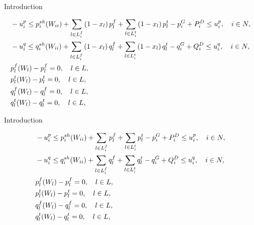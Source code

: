 \documentclass[xcolor=dvipsnames]{beamer}
\newcommand{\p}[1]{p^{#1}}
\newcommand{\q}[1]{q^{#1}}
\newcommand{\ii}{i}
\newcommand{\llll}{l}
\newcommand{\from}{f}
\newcommand{\tto}{t}
\newcommand{\WW}{W}
\newcommand{\Lines}{L}
\begin{document}
\begin{frame}{Introduction}
\begin{footnotesize}
\begin{subequations}
\label{EqPFEq}
\begin{align}
  & -u_i^p \leq  p_i^{sh}(\WW_{ii}) 
+ \sum_{\llll \in \Lines_\ii^{\from} } \left( 1 - x_\llll\right) \p{\from}_{\llll} 
	+\sum_{\llll \in \Lines_\ii^{\tto} } \left( 1 - x_\llll\right)\p{\tto}_{\llll} - p^G_i + P^D_i \le u_i^p, \quad i\in N, \notag\\ 
  &-u_i^q \leq q_\ii^{sh}(\WW_{\ii\ii}) + \sum_{\llll \in \Lines_\ii^{\from} } \left( 1 - x_\llll\right) \q{\from}_{\llll} +\sum_{\llll \in \Lines_\ii^{\tto} } \left( 1 - x_\llll\right) \q{\tto}_{\llll} - q^G_i + Q^D_i \le u_i^q, \quad i\in N, \notag \\
& \p{\from}_{\llll}(\WW_\llll) - \p{\from}_{\llll} = 0, \quad \llll \in L, \notag \\
& \p{\tto}_{\llll}(\WW_\llll) - \p{\tto}_{\llll} = 0, \quad \llll \in L, \notag \\
& \q{\from}_{\llll}(\WW_\llll) - \q{\from}_{\llll} = 0, \quad \llll \in L, \notag \\
& \q{\tto}_{\llll}(\WW_\llll) - \q{\tto}_{\llll} = 0, \quad \llll \in L, \notag 
\end{align}
\end{subequations}
\end{footnotesize}

\end{frame}

\begin{frame}{Introduction}
\begin{footnotesize}
\begin{subequations}
\label{EqPFEq}
\begin{align}
  & -u_i^p \leq  p_i^{sh}(\WW_{ii}) 
+ \sum_{\llll \in \Lines_\ii^{\from} } \p{\from}_{\llll} 
	+\sum_{\llll \in \Lines_\ii^{\tto} } \p{\tto}_{\llll} - p^G_i + P^D_i \le u_i^p, \quad i\in N, \notag\\ 
  &-u_i^q \leq q_\ii^{sh}(\WW_{\ii\ii}) + \sum_{\llll \in \Lines_\ii^{\from} } \q{\from}_{\llll} +\sum_{\llll \in \Lines_\ii^{\tto} } \q{\tto}_{\llll} - q^G_i + Q^D_i \le u_i^q, \quad i\in N, \notag \\
& \p{\from}_{\llll}(\WW_\llll) - \p{\from}_{\llll} = 0, \quad \llll \in L, \notag \\
& \p{\tto}_{\llll}(\WW_\llll) - \p{\tto}_{\llll} = 0, \quad \llll \in L, \notag \\
& \q{\from}_{\llll}(\WW_\llll) - \q{\from}_{\llll} = 0, \quad \llll \in L, \notag \\
& \q{\tto}_{\llll}(\WW_\llll) - \q{\tto}_{\llll} = 0, \quad \llll \in L, \notag 
\end{align}
\end{subequations}
\end{footnotesize}

\end{frame}
\end{document}
